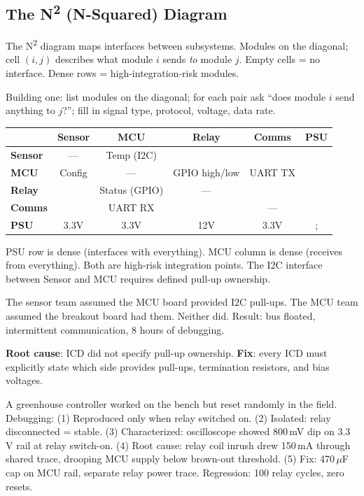 \documentclass[11pt,letterpaper,twoside,openany]{book}
\begin{document}
\subsection{The N\textsuperscript{2} (N-Squared) Diagram}
The N\textsuperscript{2} diagram maps interfaces between subsystems. Modules on the diagonal; cell $(i,j)$ describes what module $i$ sends \emph{to} module $j$. Empty cells = no interface. Dense rows = high-integration-risk modules.

Building one: list modules on the diagonal; for each pair ask ``does module $i$ send anything to $j$?''; fill in signal type, protocol, voltage, data rate.

\begin{greenshieldbox}
\small
\begin{tabularx}{\textwidth}{l|c|c|c|c|c}
 & \textbf{Sensor} & \textbf{MCU} & \textbf{Relay} & \textbf{Comms} & \textbf{PSU} \\
\hline
\textbf{Sensor} & --- & Temp (I2C) & & & \\
\hline
\textbf{MCU} & Config & --- & GPIO high/low & UART TX & \\
\hline
\textbf{Relay} & & Status (GPIO) & --- & & \\
\hline
\textbf{Comms} & & UART RX & & --- & \\
\hline
\textbf{PSU} & 3.3V & 3.3V & 12V & 3.3V &; \\
\end{tabularx}

PSU row is dense (interfaces with everything). MCU column is dense (receives from everything). Both are high-risk integration points. The I2C interface between Sensor and MCU requires defined pull-up ownership.
\end{greenshieldbox}

\begin{greenshieldbox}
The sensor team assumed the MCU board provided I2C pull-ups. The MCU team assumed the breakout board had them. Neither did. Result: bus floated, intermittent communication, 8 hours of debugging.

\textbf{Root cause}: ICD did not specify pull-up ownership. \textbf{Fix}: every ICD must explicitly state which side provides pull-ups, termination resistors, and bias voltages.
\end{greenshieldbox}

\begin{tipbox}
A greenhouse controller worked on the bench but reset randomly in the field. Debugging: (1) Reproduced only when relay switched on. (2) Isolated: relay disconnected = stable. (3) Characterized: oscilloscope showed 800\,mV dip on 3.3\,V rail at relay switch-on. (4) Root cause: relay coil inrush drew 150\,mA through shared trace, drooping MCU supply below brown-out threshold. (5) Fix: 470\,$\mu$F cap on MCU rail, separate relay power trace. Regression: 100 relay cycles, zero resets.
\end{tipbox}
\end{document}
